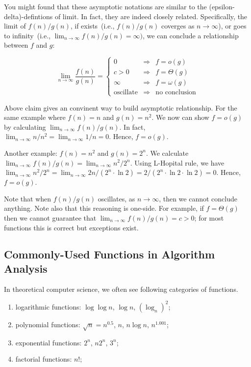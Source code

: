 You might found that these asymptotic notations are similar to the (epsilon-delta)-defintions of limit.
In fact, they are indeed closely related. Specifically, the limit of $f(n)/g(n)$, if exists~(i.e., $f(n)/g(n)$ coverges as $n\to\infty$),
or goes to infinity~(i.e., $\lim_{n\to\infty} f(n)/g(n) = \infty)$, we can conclude a relationship between $f$ and $g$:

\begin{displaymath}
\lim_{n\to\infty} \frac{f(n)}{g(n)} = \left\{
\begin{array}{llll}
0 & \Rightarrow & f = o(g) \\
c > 0 & \Rightarrow & f = \Theta(g) \\
\infty & \Rightarrow & f = \omega(g) \\
\textrm{oscillate} & \Rightarrow & \textrm{no conclusion}
\end{array}
\right.
\end{displaymath}

Above claim gives an convinent way to build asymptotic relationship.
For the same example where $f(n) = n$ and $g(n) = n^2$. We now can show $f = o(g)$ by
calculating $\lim_{n\to\infty} f(n)/g(n)$.
In fact, $\lim_{n\to\infty} n/n^2 = \lim_{n\to\infty} 1 / n = 0$.
Hence, $f = o(g)$.

Another example: $f(n) = n^2$ and $g(n) = 2^n$. We calculate $\lim_{n\to\infty} f(n)/g(n) = \lim_{n\to\infty} n^2/2^n$.
Using L-Hopital rule, we have  $\lim_{n\to\infty} n^2/2^n = \lim_{n\to\infty}
2n/(2^n\cdot \ln 2) = 2/(2^n\cdot \ln 2\cdot \ln 2) =  0$.  Hence, $f=o(g)$.

Note that when $f(n)/g(n)$ oscillates, as $n\to\infty$, then we cannot conclude anything.
Note also that this reasoning is one-side. For example, if $f = \Theta(g)$ then we cannot guarantee that
$\lim_{n\to\infty} f(n)/g(n) = c > 0$; for most functions this is correct but exceptions exist.


\subsection*{Commonly-Used Functions in Algorithm Analysis}

In theoretical computer science, we often see following categories of functions.
\vspace*{-\topsep}
\begin{enumerate}
\item logarithmic functions: $\log\log n$, $\log n$, $(\log_n)^2$;
\item polynomial functions: $\sqrt{n} = n^{0.5}$, $n$, $n\log n$, $n^{1.001}$;
\item exponential functions: $2^n$, $n2^n$, $3^n$;
\item factorial functions: $n!$;
\end{enumerate}

